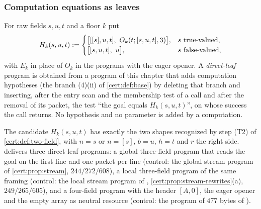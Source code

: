 \subsubsection*{Computation equations as leaves}

\begin{definition}\label{cert:def:leaf}
For raw fields $s,u,t$ and a floor $k$ put
\[
H_k(s,u,t)\mathrel{:=}
\begin{cases}
\bigl[[[s],u,t],\ O_k(t;[s,u,t],3)\bigr], & s\text{ true-valued},\\
\bigl[[s,u,t],\ u\bigr], & s\text{ false-valued},
\end{cases}
\]
with $E_k$ in place of $O_k$ in the programs with the eager opener. A
\emph{direct-leaf} program is obtained from a program of this chapter that adds
computation hypotheses (the branch (4)(ii) of \cref{cert:def:base}) by
deleting that branch and inserting, after the entry scan and the membership
test of a call and after the removal of its packet, the test ``the goal equals
$H_k(s,u,t)$'', on whose success the call returns. No hypothesis and no
parameter is added by a computation.
\end{definition}

The candidate $H_k(s,u,t)$ has exactly the two shapes recognized by step (T2)
of \cref{cert:def:two-field}, with $n=s$ or $n=[s]$, $b=u$, $h=t$ and $r$ the
right side.  delivers three direct-leaf programs: a
global three-field program that reads the goal on the first line and one
packet per line (control: the global stream program of
\cref{cert:prop:stream}, $244/272/608$), a local three-field program of the
same framing (control: the local stream program of ,
\cref{cert:prop:stream-rewrites}(a), $249/265/605$), and a four-field program
with the header $[A,0]$, the eager opener and the empty array as neutral
resource (control: the program of $477$ bytes of ).

